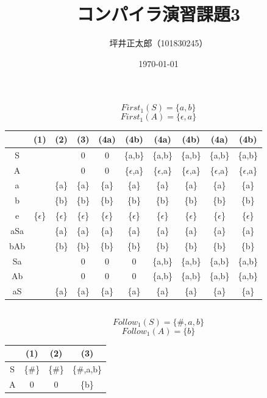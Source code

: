 \documentclass[a4paper,10pt]{jsarticle}
\begin{document}
\title{コンパイラ演習課題3}
\author{坪井正太郎（101830245）}
\date{\today}
\maketitle
\section{}
\subsection{}
\[First_1(S)=\{a,b\}\]
\[First_1(A)=\{\epsilon,a\}\]
\begin{table}[htb]
  \centering
  \begin{tabular}{c|c|c|c|c|c|c|c|c|c}
      & (1)   & (2)   & (3)   & (4a)  & (4b)    & (4a)    & (4b)    & (4a)    & (4b)    \\ \hline
  S   &       &       & 0     & 0     & \{a,b\} & \{a,b\} & \{a,b\} & \{a,b\} & \{a,b\} \\
  A   &       &       & 0     & 0     & \{$\epsilon$,a\} & \{$\epsilon$,a\} & \{$\epsilon$,a\} & \{$\epsilon$,a\} & \{$\epsilon$,a\} \\
  a   &       & \{a\} & \{a\} & \{a\} & \{a\}   & \{a\}   & \{a\}   & \{a\}   & \{a\}   \\
  b   &       & \{b\} & \{b\} & \{b\} & \{b\}   & \{b\}   & \{b\}   & \{b\}   & \{b\}   \\
  e   & \{$\epsilon$\} & \{$\epsilon$\} & \{$\epsilon$\} & \{$\epsilon$\} & \{$\epsilon$\}   & \{$\epsilon$\}   & \{$\epsilon$\}   & \{$\epsilon$\}   & \{$\epsilon$\}   \\
  aSa &       & \{a\} & \{a\} & \{a\} & \{a\}   & \{a\}   & \{a\}   & \{a\}   & \{a\}   \\
  bAb &       & \{b\} & \{b\} & \{b\} & \{b\}   & \{b\}   & \{b\}   & \{b\}   & \{b\}   \\
  Sa  &       &       & 0     & 0     & 0       & \{a,b\} & \{a,b\} & \{a,b\} & \{a,b\} \\
  Ab  &       &       & 0     & 0     & 0       & \{a,b\} & \{a,b\} & \{a,b\} & \{a,b\} \\
  aS  &       & \{a\} & \{a\} & \{a\} & \{a\}   & \{a\}   & \{a\}   & \{a\}   & \{a\}  
  \end{tabular}
\end{table}

\newpage
\subsection{}
\[Follow_1(S)=\{\#,a,b\}\]
\[Follow_1(A)=\{b\}\]
\begin{table}[htb]
  \centering
  \begin{tabular}{c|c|c|c}
    & (1)    & (2)    & (3)        \\ \hline
  S & \{\#\} & \{\#\} & \{\#,a,b\} \\
  A & 0      & 0      & \{b\}     
  \end{tabular}
\end{table}
\end{document}
